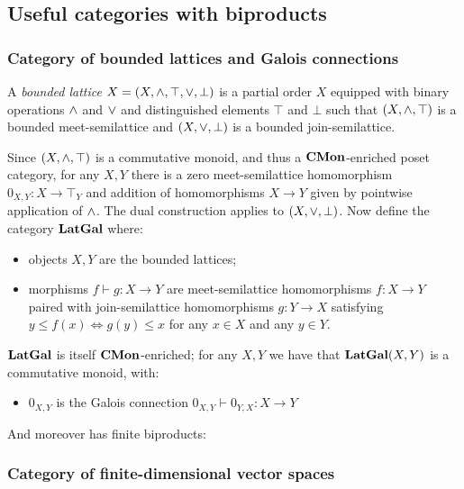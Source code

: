 \subsection{Useful categories with biproducts}
\label{sec:categories-with-biproducts}

\subsubsection{Category of bounded lattices and Galois connections}
\label{sec:categories-with-biproducts:latgal}

\begin{definition}
A \emph{bounded lattice} $X = (X, \wedge, \top, \vee, \bot)$ is a partial order $X$ equipped with binary
operations $\wedge$ and $\vee$ and distinguished elements $\top$ and $\bot$ such that $(X, \wedge, \top)$ is a
bounded meet-semilattice and $(X, \vee, \bot)$ is a bounded join-semilattice.
\end{definition}

\noindent Since $(X, \wedge, \top)$ is a commutative monoid, and thus a $\mathbf{CMon}$-enriched poset category, for
any $X, Y$ there is a zero meet-semilattice homomorphism $0_{X,Y}: X \to \top_Y$ and addition of homomorphisms
$X \to Y$ given by pointwise application of $\wedge$. The dual construction applies to $(X, \vee, \bot)$. Now
define the category $\mathbf{LatGal}$ where:
\begin{itemize}
\item objects $X, Y$ are the bounded lattices;
\item morphisms $f \vdash g: X \to Y$ are meet-semilattice homomorphisms $f: X \to Y$ paired with
join-semilattice homomorphisms $g: Y \to X$ satisfying $y \leq f(x) \iff g(y) \leq x$ for any $x \in X$ and any
$y \in Y$.
\end{itemize}

\noindent $\mathbf{LatGal}$ is itself $\mathbf{CMon}$-enriched; for any $X, Y$ we have that $\mathbf{LatGal}(X,Y)$ is a commutative
monoid, with:
\begin{itemize}
\item $0_{X,Y}$ is the Galois connection $0_{X,Y} \vdash 0_{Y,X}: X \to Y$
\end{itemize}

\noindent And moreover has finite biproducts:

\subsubsection{Category of finite-dimensional vector spaces}
\label{sec:categories-with-biproducts:fdvect}

%
